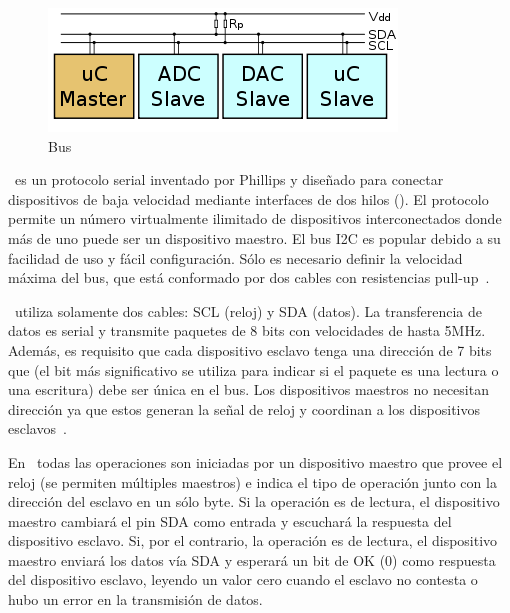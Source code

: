 %
%



\begin{figure}
	\centering
	\includegraphics[width=0.3\columnwidth]{img/i2c-bus.png}
	\caption{Bus \IIC}%
	\label{fig:iic-bus}
\end{figure}
\IIC~es un protocolo serial inventado por Phillips y diseñado para conectar dispositivos de baja velocidad mediante interfaces de dos hilos ().
El protocolo permite un número virtualmente ilimitado de dispositivos interconectados donde más de uno puede ser un dispositivo maestro.
El bus I2C es popular debido a su facilidad de uso y fácil configuración.
Sólo es necesario definir la velocidad máxima del bus, que está conformado por dos cables con resistencias pull-up~.

\IIC~utiliza solamente dos cables: SCL (reloj) y SDA (datos).
La transferencia de datos es serial y transmite paquetes de 8 bits con velocidades de hasta 5MHz.
Además, es requisito que cada dispositivo esclavo tenga una dirección de 7 bits que (el bit más significativo se utiliza para indicar si el paquete es una lectura o una escritura) debe ser única en el bus.
Los dispositivos maestros no necesitan dirección ya que estos generan la señal de reloj y coordinan a los dispositivos esclavos~.

En \IIC~todas las operaciones son iniciadas por un dispositivo maestro que provee el reloj (se permiten múltiples maestros) e indica el tipo de operación junto con la dirección del esclavo en un sólo byte.
Si la operación es de lectura, el dispositivo maestro cambiará el pin SDA como entrada y escuchará la respuesta del dispositivo esclavo.
Si, por el contrario, la operación es de lectura, el dispositivo maestro enviará los datos vía SDA y esperará un bit de OK (0) como respuesta del dispositivo esclavo, leyendo un valor cero cuando el esclavo no contesta o hubo un error en la transmisión de datos.

